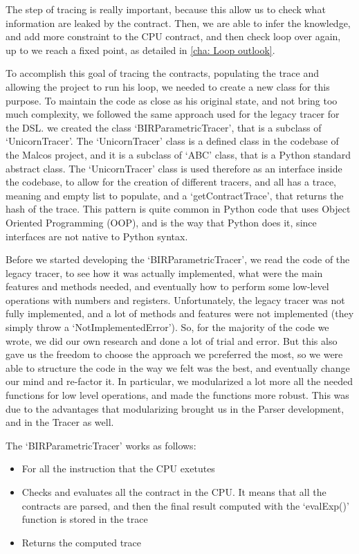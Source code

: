 The step of tracing is really important, because this allow us to check what information
are leaked by the contract. Then, we are able to infer the knowledge, and add
more constraint to the CPU contract, and then check loop over again, up to we
reach a fixed point, as detailed in \cref{cha: Loop outlook}.

To accomplish this goal of tracing the contracts, populating the trace and
allowing the project to run his loop, we needed to create a new class for this purpose.
To maintain the code as close as his original state, and not bring too much complexity,
we followed the same approach used for the legacy tracer for the DSL. we created
the class `BIRParametricTracer', that is a subclass of `UnicornTracer'. The `UnicornTracer'
class is a defined class in the codebase of the Malcos project, and it is a
subclass of `ABC' class, that is a Python standard abstract class. The `UnicornTracer'
class is used therefore as an interface inside the codebase, to allow for the creation
of different tracers, and all has a trace, meaning and empty list to populate,
and a `getContractTrace', that returns the hash of the trace. This pattern is
quite common in Python code that uses Object Oriented Programming (OOP), and is the
way that Python does it, since interfaces are not native to Python syntax.

Before we started developing the `BIRParametricTracer', we read the code of the legacy
tracer, to see how it was actually implemented, what were the main features and methods
needed, and eventually how to perform some low-level operations with numbers and
registers. Unfortunately, the legacy tracer was not fully implemented, and a lot
of methods and features were not implemented (they simply throw a `NotImplementedError').
So, for the majority of the code we wrote, we did our own research and done a
lot of trial and error. But this also gave us the freedom to choose the approach
we pcreferred the most, so we were able to structure the code in the way we felt
was the best, and eventually change our mind and re-factor it. In particular, we
modularized a lot more all the needed functions for low level operations, and
made the functions more robust. This was due to the advantages that modularizing
brought us in the Parser development, and in the Tracer as well.

The `BIRParametricTracer' works as follows:
\begin{itemize}
  \item For all the instruction that the CPU exetutes

  \item Checks and evaluates all the contract in the CPU. It means that all the
    contracts are parsed, and then the final result computed with the `evalExp()'
    function is stored in the trace

  \item Returns the computed trace
\end{itemize}

